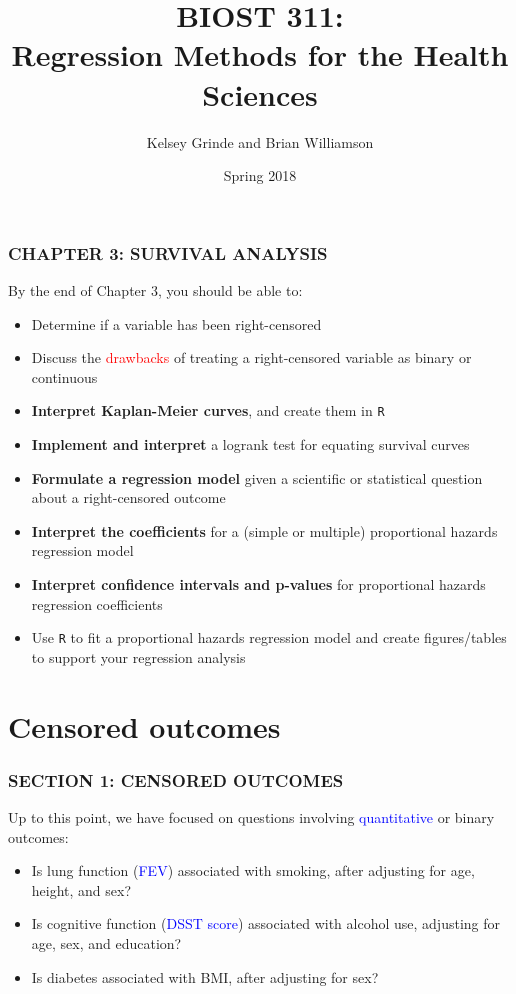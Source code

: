 \documentclass[12pt, 
hyperref={colorlinks=true, linkcolor=blue, urlcolor=cyan},dvipsnames]{beamer}
\title{BIOST 311: \\ Regression Methods for the Health Sciences}
\author{Kelsey Grinde and Brian Williamson}
\institute{UW Biostatistics}
\date{Spring 2018}
\begin{document}
\begin{frame}
\titlepage\thispagestyle{empty}
\end{frame}

  
\setcounter{framenumber}{\value{chap3}}

\begin{frame}
\frametitle{CHAPTER 3: SURVIVAL ANALYSIS}
By the end of Chapter 3, you should be able to: \vspace{-0.3cm}

\begin{itemize}
\item Determine if a variable has been \textcolor{BurntOrange}{right-censored}
\item Discuss the \textcolor{red}{drawbacks} of treating a right-censored variable as binary or continuous
\item \textbf{Interpret Kaplan-Meier curves}, and create them in \texttt{R}
\item \textbf{Implement and interpret} a logrank test for equating survival curves
\item \textbf{Formulate a regression model} given a scientific or statistical question about a right-censored outcome
\item \textbf{Interpret the coefficients} for a (simple or multiple) proportional hazards regression model
\item \textbf{Interpret confidence intervals and p-values} for proportional hazards regression coefficients
\item Use \texttt{R} to fit a proportional hazards regression model and create figures/tables to support your regression analysis
\end{itemize}

\end{frame}

\section{Censored outcomes}
\begin{frame}
\frametitle{SECTION 1: CENSORED OUTCOMES}
Up to this point, we have focused on questions involving \textcolor{blue}{quantitative} or \textcolor{BurntOrange}{binary} outcomes: 
\begin{itemize}
\item Is lung function (\textcolor{blue}{FEV}) associated with smoking, after adjusting for age, height, and sex?
\item Is cognitive function (\textcolor{blue}{DSST score}) associated with alcohol use, adjusting for age, sex, and education?
\item Is \textcolor{BurntOrange}{diabetes} associated with BMI, after adjusting for sex?
\end{itemize}
\end{frame}
\end{document}
